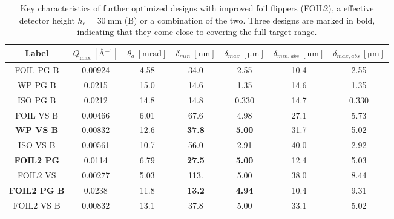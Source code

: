\begin{table}[h!]
	\centering
	\begin{tabular}{c | c c c c | cc}
		\toprule
		Label & $Q_{\text{max}} ~[\unit{\angstrom^{-1}}]$ & $\theta_a~[\unit{\milli\radian}]$ & $\delta_{min}~[\unit{\nano\meter}]$ & $\delta_{max}~[\unit{\micro\meter}]$ & $\delta_{min,abs}~[\unit{\nano\meter}]$ & $\delta_{max,abs}~[\unit{\micro\meter}]$ \\
		\midrule
		FOIL PG B & \num{0.00924} & \num{4.58} & \num{34.0} & \num{2.55} & \num{10.4} & \num{2.55} \\
		WP PG B & \num{0.0215} & \num{15.0} & \num{14.6} & \num{1.35} & \num{14.6} & \num{1.35} \\
		ISO PG B & \num{0.0212} & \num{14.8} & \num{14.8} & \num{0.330} & \num{14.7} & \num{0.330} \\
		FOIL VS B & \num{0.00466} & \num{6.01} & \num{67.6} & \num{4.98} & \num{27.1} & \num{5.73} \\
		\textbf{WP VS B} & \num{0.00832} & \num{12.6} & \textbf{37.8} & \textbf{5.00} & \num{31.7} & \num{5.02} \\
		ISO VS B & \num{0.00561} & \num{10.7} & \num{56.0} & \num{2.91} & \num{40.0} & \num{2.92} \\
		\midrule
		\textbf{FOIL2 PG} & \num{0.0114} & \num{6.79} & \textbf{27.5} & \textbf{5.00} & \num{12.4} & \num{5.03} \\
		FOIL2 VS & \num{0.00277} & \num{5.03} & \num{113.} & \num{5.00} & \num{38.0} & \num{8.44} \\
		\textbf{FOIL2 PG B} & \num{0.0238} & \num{11.8} & \textbf{13.2} & \textbf{4.94} & \num{10.4} & \num{9.31} \\
		FOIL2 VS B & \num{0.00832} & \num{13.1} & \num{37.8} & \num{5.00} & \num{33.1} & \num{5.02} \\
		\bottomrule
	\end{tabular}
	\caption{Key characteristics of further optimized designs with improved foil flippers (FOIL2), a effective detector height $h_e = \SI{30}{\milli\meter}$ (B) or a combination of the two. Three designs are marked in bold, indicating that they come close to covering the full target range.}
	\label{tab:optimized-designs-performance-detector-boost}
\end{table}